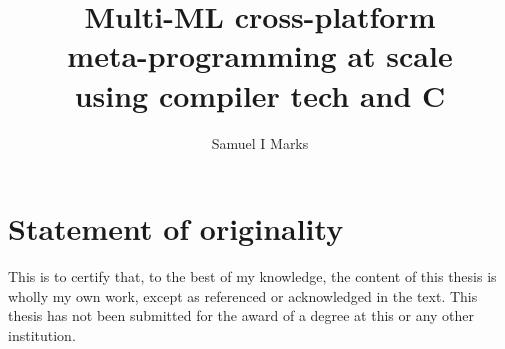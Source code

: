 

\def \thesisAuthor{Samuel I Marks}

\title{Multi-ML cross-platform\\meta-programming at scale\\using compiler tech and C}

\author{\thesisAuthor}

   \isbnprinted{} \isbnelectronic{}   

\usepackage[nomain,abbreviations,acronym,postdot]{glossaries-extra}

\makeglossaries






\frontmatter

\maketitle

\mainmatter

\cleardoublepage


\renewcommand{\bibname}{References}

\setcounter{page}{1}

\fancyhf{}  

\makeatletter\@openrightfalse

\tableofcontents


\chapter*{Statement of originality}
This is to certify that, to the best of my knowledge, the content of this thesis is wholly my own work, except as referenced or acknowledged in the text. This thesis has not been submitted for the award of a degree at this or any other institution.


